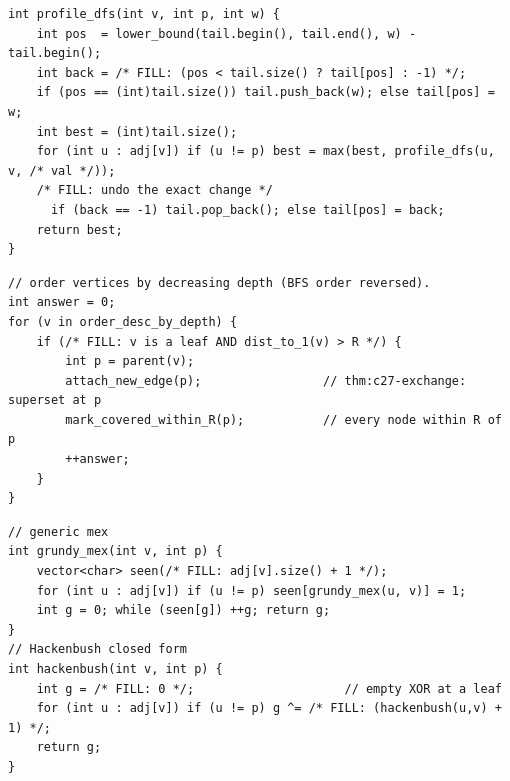 \begin{lstlisting}[caption={Drill 2 -- the rollback profile DFS (from \coderef{c27-profile})}]
int profile_dfs(int v, int p, int w) {
    int pos  = lower_bound(tail.begin(), tail.end(), w) - tail.begin();
    int back = /* FILL: (pos < tail.size() ? tail[pos] : -1) */;
    if (pos == (int)tail.size()) tail.push_back(w); else tail[pos] = w;
    int best = (int)tail.size();
    for (int u : adj[v]) if (u != p) best = max(best, profile_dfs(u, v, /* val */));
    /* FILL: undo the exact change */
      if (back == -1) tail.pop_back(); else tail[pos] = back;
    return best;
}
\end{lstlisting}

\begin{lstlisting}[caption={Drill 3 -- deepest-uncovered leaf-prune greedy (from \coderef{c27-greedy})}]
// order vertices by decreasing depth (BFS order reversed).
int answer = 0;
for (v in order_desc_by_depth) {
    if (/* FILL: v is a leaf AND dist_to_1(v) > R */) {
        int p = parent(v);
        attach_new_edge(p);                 // thm:c27-exchange: superset at p
        mark_covered_within_R(p);           // every node within R of p
        ++answer;
    }
}
\end{lstlisting}

\begin{lstlisting}[caption={Drill 4 -- Grundy / Hackenbush fold (from \coderef{c27-grundy})}]
// generic mex
int grundy_mex(int v, int p) {
    vector<char> seen(/* FILL: adj[v].size() + 1 */);
    for (int u : adj[v]) if (u != p) seen[grundy_mex(u, v)] = 1;
    int g = 0; while (seen[g]) ++g; return g;
}
// Hackenbush closed form
int hackenbush(int v, int p) {
    int g = /* FILL: 0 */;                     // empty XOR at a leaf
    for (int u : adj[v]) if (u != p) g ^= /* FILL: (hackenbush(u,v) + 1) */;
    return g;
}
\end{lstlisting}

